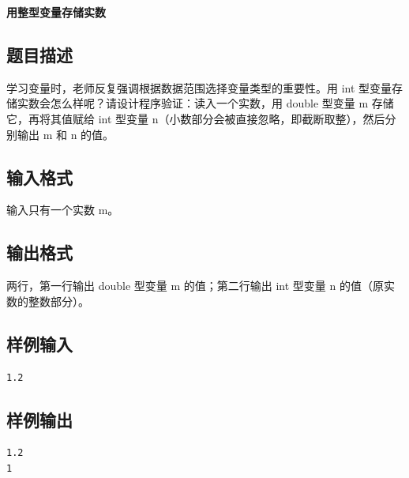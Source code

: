 \documentclass{article}
\newcommand{\problemname}[1]{\begin{center}\Large\bfseries #1\end{center}}
\begin{document}
\problemname{用整型变量存储实数}

\subsection*{题目描述}
学习变量时，老师反复强调根据数据范围选择变量类型的重要性。用 int 型变量存储实数会怎么样呢？请设计程序验证：读入一个实数，用 double 型变量 m 存储它，再将其值赋给 int 型变量 n（小数部分会被直接忽略，即截断取整），然后分别输出 m 和 n 的值。

\subsection*{输入格式}
输入只有一个实数 m。

\subsection*{输出格式}
两行，第一行输出 double 型变量 m 的值；第二行输出 int 型变量 n 的值（原实数的整数部分）。

\subsection*{样例输入}
\begin{verbatim}
1.2
\end{verbatim}

\subsection*{样例输出}
\begin{verbatim}
1.2
1
\end{verbatim}
\end{document}
